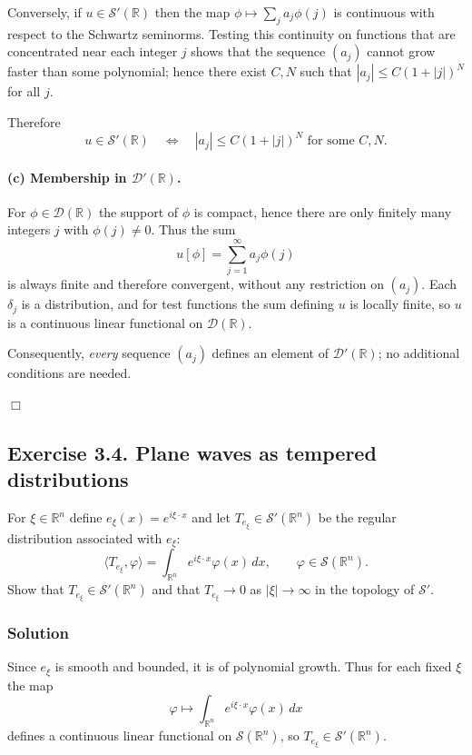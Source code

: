 \documentclass[12pt,a4paper]{article}
\theoremstyle{plain}
\theoremstyle{definition}
\theoremstyle{remark}
\theoremstyle{remark}
\begin{document}
Conversely, if $u\in\mathcal{S}'(\mathbb{R})$ then the map
$\phi\mapsto \sum_j a_j\phi(j)$ is continuous with respect to the
Schwartz seminorms. Testing this continuity on functions that are
concentrated near each integer $j$ shows that the sequence $(a_j)$
cannot grow faster than some polynomial; hence there exist $C,N$ such
that $|a_j|\le C(1+|j|)^N$ for all $j$.

Therefore
\[
u\in\mathcal{S}'(\mathbb{R})
\quad\Longleftrightarrow\quad
|a_j|\le C(1+|j|)^N \text{ for some }C,N.
\]

\paragraph{(c) Membership in $\mathcal{D}'(\mathbb{R})$.}
For $\phi\in\mathcal{D}(\mathbb{R})$ the support of $\phi$ is compact,
hence there are only finitely many integers $j$ with $\phi(j)\neq0$.
Thus the sum
\[
u[\phi] = \sum_{j=1}^\infty a_j\phi(j)
\]
is always finite and therefore convergent, without any restriction on
$(a_j)$. Each $\delta_j$ is a distribution, and for test functions the
sum defining $u$ is locally finite, so $u$ is a continuous linear
functional on $\mathcal{D}(\mathbb{R})$.

Consequently, \emph{every} sequence $(a_j)$ defines an element of
$\mathcal{D}'(\mathbb{R})$; no additional conditions are needed.

\hfill$\Box$

\subsection*{Exercise 3.4. Plane waves as tempered distributions}

For $\xi\in\mathbb{R}^n$ define $e_\xi(x)=e^{i\xi\cdot x}$ and let
$T_{e_\xi}\in\mathcal{S}'(\mathbb{R}^n)$ be the regular distribution
associated with $e_\xi$:
\[
\langle T_{e_\xi},\varphi\rangle
= \int_{\mathbb{R}^n} e^{i\xi\cdot x}\varphi(x)\,dx,
\qquad \varphi\in\mathcal{S}(\mathbb{R}^n).
\]
Show that $T_{e_\xi}\in\mathcal{S}'(\mathbb{R}^n)$ and that
$T_{e_\xi}\to 0$ as $|\xi|\to\infty$ in the topology of $\mathcal{S}'$.

\subsubsection*{Solution}

Since $e_\xi$ is smooth and bounded, it is of polynomial growth. Thus
for each fixed $\xi$ the map
\[
\varphi\mapsto \int_{\mathbb{R}^n} e^{i\xi\cdot x}\varphi(x)\,dx
\]
defines a continuous linear functional on $\mathcal{S}(\mathbb{R}^n)$,
so $T_{e_\xi}\in\mathcal{S}'(\mathbb{R}^n)$.
\end{document}
